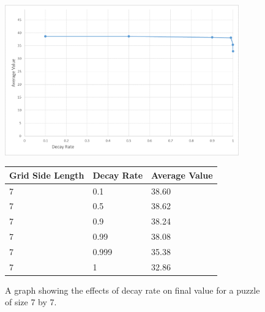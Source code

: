 \documentclass[12pt]{article}
\begin{document}
\begin{figure}[H]
    \centering
    \includegraphics[width=0.9\textwidth]{simulated_annealing_7x7_decay_excel}
\begin{tabular}{ |p{4cm}||p{4cm}|p{4cm}|  }
 \hline
Grid Side Length& Decay Rate &Average Value\\
 \hline
7&0.1&38.60\\
7&0.5&38.62\\
7&0.9&38.24\\
7&0.99&38.08\\
7&0.999&35.38\\
7&1&32.86\\
 \hline
\end{tabular}
    \caption{A graph showing the effects of decay rate on final value for a puzzle of size 7 by 7.}
    \label{fig:simulated_annealing_7x7_decay}
\end{figure}
\end{document}
